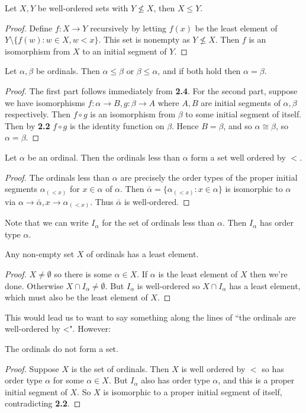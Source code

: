\documentclass[10pt,a4paper]{article}
\begin{document}
\begin{proposition}
Let $X,Y$ be well-ordered sets with $Y \nleq X$, then $X \leq Y$.
\end{proposition}
\begin{proof}
Define $f:X\to Y$ recursively by letting $f(x)$ be the least element of $Y \setminus\{f(w): w \in X, w< x\}$. This set is nonempty as $Y \nleq X$. Then $f$ is an isomorphism from $X$ to an initial segment of $Y$.
\end{proof}
\begin{proposition}[Trichotomy]
Let $\alpha, \beta$ be ordinals. Then $\alpha \leq \beta$ or $\beta \leq \alpha$, and if both hold then $\alpha = \beta$.
\end{proposition}
\begin{proof}
The first part follows immediately from \textbf{2.4}. For the second part, suppose we have isomorphisms $f:\alpha \to B, g:\beta \to A$ where $A,B$ are initial segments of $\alpha, \beta$ respectively. Then $f \circ g$ is an isomorphism from $\beta$ to some initial segment of itself. Then by \textbf{2.2} $f\circ g$ is the identity function on $\beta$. Hence $B = \beta$, and so $\alpha \cong \beta$, so $\alpha = \beta$.
\end{proof}
\begin{theorem}
Let $\alpha$ be an ordinal. Then the ordinals less than $\alpha$ form a set well ordered by $<$.
\end{theorem}
\begin{proof}
The ordinals less than $\alpha$ are precisely the order types of the proper initial segments $\alpha_{(<x)}$ for $x \in \alpha$ of $\alpha$. Then $\bar{\alpha} = \{\alpha_{(<x)} : x \in \alpha\}$ is isomorphic to $\alpha$ via $\alpha \to \bar{\alpha}, x \to \alpha_{(<x)}$. Thus $\bar{\alpha}$ is well-ordered.
\end{proof}
Note that we can write $I_{\alpha}$ for the set of ordinals less than $\alpha$. Then $I_\alpha$ has order type $\alpha$.
\begin{corollary}
Any non-empty set $X$ of ordinals has a least element.
\end{corollary}
\begin{proof}
$X \neq \emptyset$ so there is some $\alpha \in X$. If $\alpha$ is the least element of $X$ then we're done. Otherwise $X \cap I_{\alpha} \neq \emptyset$. But $I_\alpha$ is well-ordered so $X \cap I_\alpha$ has a least element, which must also be the least element of $X$.
\end{proof}
This would lead us to want to say something along the lines of ``the ordinals are well-ordered by <". However:
\begin{theorem}
The ordinals do not form a set.
\end{theorem}
\begin{proof}
Suppose $X$ is the set of ordinals. Then $X$ is well ordered by $<$ so has order type $\alpha$ for some $\alpha \in X$. But $I_\alpha$ also has order type $\alpha$, and this is a proper initial segment of $X$. So $X$ is isomorphic to a proper initial segment of itself, contradicting \textbf{2.2}.\contr
\end{proof}
\end{document}

